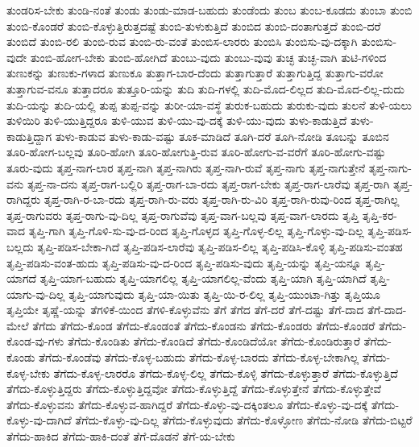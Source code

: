 {ತುಂಡರಿಸ-ಬೇಕು
ತುಂಡಿ-ನಂತೆ
ತುಂಡು
ತುಂಡು-ಮಾಡ-ಬಹುದು
ತುಂಡೆಂದು
ತುಂಬ
ತುಂಬ-ಕೂಡದು
ತುಂಬಾ
ತುಂಬಿ
ತುಂಬಿ-ಕೊಂಡರೆ
ತುಂಬಿ-ಕೊಳ್ಳುತ್ತಿರುತ್ತದಷ್ಟೆ
ತುಂಬಿ-ತುಳುಕುತ್ತಿದೆ
ತುಂಬಿದ
ತುಂಬಿ-ದಂತಾಗುತ್ತದೆ
ತುಂಬಿ-ದರೆ
ತುಂಬಿದೆ
ತುಂಬಿ-ರಲಿ
ತುಂಬಿ-ರುವ
ತುಂಬಿ-ರು-ವಂತೆ
ತುಂಬಿಸ-ಲಾರರು
ತುಂಬಿಸಿ
ತುಂಬಿಸು-ವು-ದಕ್ಕಾಗಿ
ತುಂಬಿಸು-ವುದೇ
ತುಂಬಿ-ಹೋಗ-ಬೇಕು
ತುಂಬಿ-ಹೋಗಿದೆ
ತುಂಬು-ವುದು
ತುಂಬು-ವುವು
ತುಚ್ಛ
ತುಚ್ಛ-ವಾಗಿ
ತುಟಿ-ಗಳಿಂದ
ತುಣುಕನ್ನು
ತುಣುಕು-ಗಳಾದ
ತುಣುಕೂ
ತುತ್ತಾಗ-ಬಾರ-ದೆಂದು
ತುತ್ತಾಗುತ್ತಾರೆ
ತುತ್ತಾಗುತ್ತಿದ್ದ
ತುತ್ತಾಗು-ವರೋ
ತುತ್ತಾಗುವ-ವನೂ
ತುತ್ತಾದರೂ
ತುತ್ತೂರಿ-ಯನ್ನು
ತುದಿ
ತುದಿ-ಗಳಲ್ಲಿ
ತುದಿ-ಮೊದ-ಲಿಲ್ಲದ
ತುದಿ-ಮೊದ-ಲಿಲ್ಲ-ದುದು
ತುದಿ-ಯನ್ನು
ತುದಿ-ಯಲ್ಲಿ
ತುಪ್ಪ
ತುಪ್ಪ-ವನ್ನು
ತುರೀ-ಯಾ-ವಸ್ಥೆ
ತುರುಕ-ಬಹುದು
ತುರುಕು-ವುದು
ತುಲನೆ
ತುಳಿ-ಯಲು
ತುಳಿಯಿರಿ
ತುಳಿ-ಯುತ್ತಿದ್ದರೂ
ತುಳಿ-ಯುವ
ತುಳಿ-ಯು-ವು-ದಕ್ಕೆ
ತುಳಿ-ಯು-ವುದು
ತುಳು-ಕಾಡುತ್ತಿದೆ
ತುಳು-ಕಾಡುತ್ತಿದ್ದಾಗ
ತುಳು-ಕಾಡುವ
ತುಳು-ಕಾಡು-ವಷ್ಟು
ತೂಕ-ಮಾಡಿದೆ
ತೂಗಿ-ದರೆ
ತೂಗಿ-ನೋಡಿ
ತೂಬನ್ನು
ತೂಬಿನ
ತೂರಿ-ಹೋಗ-ಬಲ್ಲವು
ತೂರಿ-ಹೋಗಿ
ತೂರಿ-ಹೋಗುತ್ತಿ-ರುವ
ತೂರಿ-ಹೋಗು-ವ-ವರೆಗೆ
ತೂರಿ-ಹೋಗು-ವಷ್ಟು
ತೂರು-ವುದು
ತೃಪ್ತ-ನಾಗ-ಲಾರ
ತೃಪ್ತ-ನಾಗಿ
ತೃಪ್ತ-ನಾಗಿರು
ತೃಪ್ತ-ನಾಗಿ-ರುವೆ
ತೃಪ್ತ-ನಾಗು
ತೃಪ್ತ-ನಾಗುತ್ತೇನೆ
ತೃಪ್ತ-ನಾಗು-ವನು
ತೃಪ್ತ-ನಾ-ದನು
ತೃಪ್ತ-ರಾಗ-ಬಲ್ಲಿರಿ
ತೃಪ್ತ-ರಾಗ-ಬಾ-ರದು
ತೃಪ್ತ-ರಾಗ-ಬೇಕು
ತೃಪ್ತ-ರಾಗ-ಲಾರೆವು
ತೃಪ್ತ-ರಾಗಿ
ತೃಪ್ತ-ರಾಗಿದ್ದರು
ತೃಪ್ತ-ರಾಗಿ-ರ-ಬಾ-ರದು
ತೃಪ್ತ-ರಾಗಿ-ರು-ವರು
ತೃಪ್ತ-ರಾಗಿ-ರು-ವಿರಿ
ತೃಪ್ತ-ರಾಗಿ-ರುವು-ರಿಂದ
ತೃಪ್ತ-ರಾಗಿಲ್ಲ
ತೃಪ್ತ-ರಾಗುವರು
ತೃಪ್ತ-ರಾಗು-ವು-ದಿಲ್ಲ
ತೃಪ್ತ-ರಾಗುವೆವು
ತೃಪ್ತ-ವಾಗ-ಬಲ್ಲವು
ತೃಪ್ತ-ವಾಗ-ಲಾರದು
ತೃಪ್ತಿ
ತೃಪ್ತಿ-ಕರ-ವಾದ
ತೃಪ್ತಿ-ಗಾಗಿ
ತೃಪ್ತಿ-ಗೊಳಿ-ಸು-ವು-ದ-ರಿಂದ
ತೃಪ್ತಿ-ಗೊಳ್ಳದ
ತೃಪ್ತಿ-ಗೊಳ್ಳ-ಲಿಲ್ಲ
ತೃಪ್ತಿ-ಗೊಳ್ಳು-ವು-ದಿಲ್ಲ
ತೃಪ್ತಿ-ಪಡಿಸ-ಬಲ್ಲದು
ತೃಪ್ತಿ-ಪಡಿಸ-ಬೇಕಾ-ಗಿದೆ
ತೃಪ್ತಿ-ಪಡಿಸ-ಲಾರೆವು
ತೃಪ್ತಿ-ಪಡಿಸ-ಲಿಲ್ಲ
ತೃಪ್ತಿ-ಪಡಿಸಿ-ಕೊಳ್ಳಿ
ತೃಪ್ತಿ-ಪಡಿಸು-ವಂತಹ
ತೃಪ್ತಿ-ಪಡಿಸು-ವಂತ-ಹುದು
ತೃಪ್ತಿ-ಪಡಿಸು-ವು-ದ-ರಿಂದ
ತೃಪ್ತಿ-ಪಡಿಸು-ವುದು
ತೃಪ್ತಿ-ಯನ್ನು
ತೃಪ್ತಿ-ಯನ್ನೂ
ತೃಪ್ತಿ-ಯಾಗದೆ
ತೃಪ್ತಿ-ಯಾಗ-ಬಹುದು
ತೃಪ್ತಿ-ಯಾಗಲಿಲ್ಲ
ತೃಪ್ತಿ-ಯಾಗಲಿಲ್ಲ-ವೆಂದು
ತೃಪ್ತಿ-ಯಾಗಿ
ತೃಪ್ತಿ-ಯಾಗಿದೆ
ತೃಪ್ತಿ-ಯಾಗು-ವು-ದಿಲ್ಲ
ತೃಪ್ತಿ-ಯಾಗುವುದು
ತೃಪ್ತಿ-ಯಾ-ಯಿತು
ತೃಪ್ತಿ-ಯಿ-ರ-ಲಿಲ್ಲ
ತೃಪ್ತಿ-ಯುಂಟಾ-ಗಿತ್ತು
ತೃಪ್ತಿಯೂ
ತೃಪ್ತಿಯೇ
ತೃಷ್ಣೆ-ಯನ್ನು
ತೆಗಳಿಕೆ-ಯಿಂದ
ತೆಗಳಿ-ಕೊಳ್ಳುವೆನು
ತೆಗೆ
ತೆಗೆದ
ತೆಗೆ-ದರೆ
ತೆಗೆ-ದಷ್ಟು
ತೆಗೆ-ದಾದ
ತೆಗೆ-ದಾದ-ಮೇಲೆ
ತೆಗೆದು
ತೆಗೆದು-ಕೊಂಡ
ತೆಗೆದು-ಕೊಂಡಂತೆ
ತೆಗೆದು-ಕೊಂಡನು
ತೆಗೆದು-ಕೊಂಡರು
ತೆಗೆದು-ಕೊಂಡರೆ
ತೆಗೆದು-ಕೊಂಡ-ವು-ಗಳು
ತೆಗೆದು-ಕೊಂಡಿತು
ತೆಗೆದು-ಕೊಂಡಿದೆ
ತೆಗೆದು-ಕೊಂಡಿದೆಯೋ
ತೆಗೆದು-ಕೊಂಡಿರುತ್ತಾರೆ
ತೆಗೆದು-ಕೊಂಡು
ತೆಗೆದು-ಕೊಂಡೆವು
ತೆಗೆದು-ಕೊಳ್ಳ-ಬಹುದು
ತೆಗೆದು-ಕೊಳ್ಳ-ಬಾರದು
ತೆಗೆದು-ಕೊಳ್ಳ-ಬೇಕಾಗಿಲ್ಲ
ತೆಗೆದು-ಕೊಳ್ಳ-ಬೇಕು
ತೆಗೆದು-ಕೊಳ್ಳ-ಲಾರರೊ
ತೆಗೆದು-ಕೊಳ್ಳ-ಲಿಲ್ಲ
ತೆಗೆದು-ಕೊಳ್ಳಿ
ತೆಗೆದು-ಕೊಳ್ಳುತ್ತಾರೆ
ತೆಗೆದು-ಕೊಳ್ಳುತ್ತಿದೆ
ತೆಗೆದು-ಕೊಳ್ಳುತ್ತಿದ್ದರು
ತೆಗೆದು-ಕೊಳ್ಳುತ್ತಿದ್ದವೋ
ತೆಗೆದು-ಕೊಳ್ಳುತ್ತಿದ್ದೆ
ತೆಗೆದು-ಕೊಳ್ಳುತ್ತೇನೆ
ತೆಗೆದು-ಕೊಳ್ಳುತ್ತೇವೆ
ತೆಗೆದು-ಕೊಳ್ಳುವನು
ತೆಗೆದು-ಕೊಳ್ಳುವ-ಹಾಗಿದ್ದರೆ
ತೆಗೆದು-ಕೊಳ್ಳು-ವು-ದಕ್ಕಿಂತಲೂ
ತೆಗೆದು-ಕೊಳ್ಳು-ವು-ದಕ್ಕೆ
ತೆಗೆದು-ಕೊಳ್ಳು-ವು-ದಾಗಿದೆ
ತೆಗೆದು-ಕೊಳ್ಳು-ವು-ದಿಲ್ಲ
ತೆಗೆದು-ಕೊಳ್ಳುವುದು
ತೆಗೆದು-ಕೊಳ್ಳೋಣ
ತೆಗೆದು-ನೋಡಿ
ತೆಗೆದು-ಬಿಟ್ಟರೆ
ತೆಗೆದು-ಹಾಕಿದ
ತೆಗೆದು-ಹಾಕಿ-ದಂತೆ
ತೆಗೆ-ದೊಡನೆ
ತೆಗೆ-ಯ-ಬೇಕು
}
